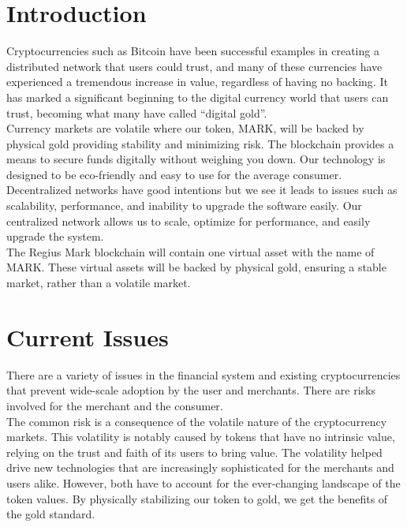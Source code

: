 \documentclass[12pt,a4paper]{article}
\begin{document}

  \newpage
  \tableofcontents
  \newpage

  \section{Introduction}
  Cryptocurrencies such as Bitcoin have been successful examples in creating a
  distributed network that users could trust, and many of these currencies have
  experienced a tremendous increase in value, regardless of having no backing.
  It has marked a significant beginning to the digital currency world that users
  can trust, becoming what many have called ``digital gold''.\\

  Currency markets are volatile where our token, MARK, will be backed by
  physical gold providing stability and minimizing risk. The blockchain provides
  a means to secure funds digitally without weighing you down. Our technology is
  designed to be eco-friendly and easy to use for the average consumer.\\

  Decentralized networks have good intentions but we see it leads to issues such
  as scalability, performance, and inability to upgrade the software easily. Our
  centralized network allows us to scale, optimize for performance, and easily
  upgrade the system.\\

  The Regius Mark blockchain will contain one virtual asset with the name of
  MARK. These virtual assets will be backed by physical gold,
  ensuring a stable market, rather than a volatile market.

  \section{Current Issues}
  There are a variety of issues in the financial system and existing
  cryptocurrencies that prevent wide-scale adoption by the user and
  merchants. There are risks involved for the merchant and the consumer.\\

  The common risk is a consequence of the volatile nature of the cryptocurrency
  markets. This volatility is notably caused by tokens that have no intrinsic
  value, relying on the trust and faith of its users to bring value. The
  volatility helped drive new technologies that are increasingly sophisticated
  for the merchants and users alike. However, both have to account for the
  ever-changing landscape of the token values. By physically stabilizing our
  token to gold, we get the benefits of the gold standard.\\
\end{document}
